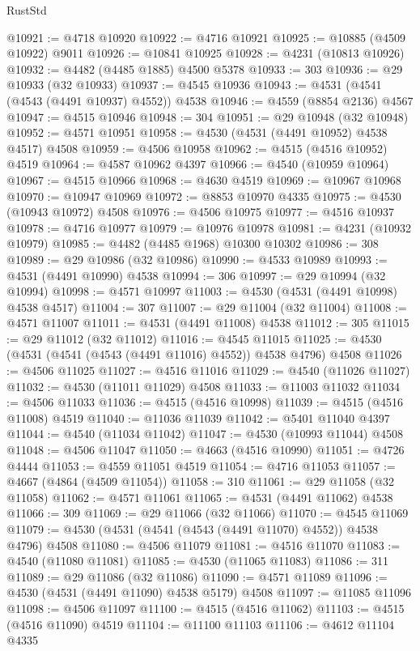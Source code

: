 \begin{lexlean}{RustStd}
\begin{coremodule}
{\begin{coremodule}
{{{{{{{{{{{{{{{{{{{{{{{{{{{{{{{{{{{{{{{{{{{{{{{{{{{{{{{@10921 := @4718 @10920
@10922 := @4716 @10921
@10925 := @10885 (@4509 @10922) @9011
@10926 := @10841 @10925
@10928 := @4231 (@10813 @10926)
@10932 := @4482 (@4485 @1885) @4500 @5378
@10933 := 303
@10936 := @29 @10933 (@32 @10933)
@10937 := @4545 @10936
@10943 := @4531 (@4541 (@4543 (@4491 @10937) @4552)) @4538
@10946 := @4559 (@8854 @2136) @4567
@10947 := @4515 @10946
@10948 := 304
@10951 := @29 @10948 (@32 @10948)
@10952 := @4571 @10951
@10958 := @4530 (@4531 (@4491 @10952) @4538 @4517) @4508
@10959 := @4506 @10958
@10962 := @4515 (@4516 @10952) @4519
@10964 := @4587 @10962 @4397
@10966 := @4540 (@10959 @10964)
@10967 := @4515 @10966
@10968 := @4630 @4519
@10969 := @10967 @10968
@10970 := @10947 @10969
@10972 := @8853 @10970 @4335
@10975 := @4530 (@10943 @10972) @4508
@10976 := @4506 @10975
@10977 := @4516 @10937
@10978 := @4716 @10977
@10979 := @10976 @10978
@10981 := @4231 (@10932 @10979)
@10985 := @4482 (@4485 @1968) @10300 @10302
@10986 := 308
@10989 := @29 @10986 (@32 @10986)
@10990 := @4533 @10989
@10993 := @4531 (@4491 @10990) @4538
@10994 := 306
@10997 := @29 @10994 (@32 @10994)
@10998 := @4571 @10997
@11003 := @4530 (@4531 (@4491 @10998) @4538 @4517)
@11004 := 307
@11007 := @29 @11004 (@32 @11004)
@11008 := @4571 @11007
@11011 := @4531 (@4491 @11008) @4538
@11012 := 305
@11015 := @29 @11012 (@32 @11012)
@11016 := @4545 @11015
@11025 := @4530 (@4531 (@4541 (@4543 (@4491 @11016) @4552)) @4538 @4796) @4508
@11026 := @4506 @11025
@11027 := @4516 @11016
@11029 := @4540 (@11026 @11027)
@11032 := @4530 (@11011 @11029) @4508
@11033 := @11003 @11032
@11034 := @4506 @11033
@11036 := @4515 (@4516 @10998)
@11039 := @4515 (@4516 @11008) @4519
@11040 := @11036 @11039
@11042 := @5401 @11040 @4397
@11044 := @4540 (@11034 @11042)
@11047 := @4530 (@10993 @11044) @4508
@11048 := @4506 @11047
@11050 := @4663 (@4516 @10990)
@11051 := @4726 @4444
@11053 := @4559 @11051 @4519
@11054 := @4716 @11053
@11057 := @4667 (@4864 (@4509 @11054))
@11058 := 310
@11061 := @29 @11058 (@32 @11058)
@11062 := @4571 @11061
@11065 := @4531 (@4491 @11062) @4538
@11066 := 309
@11069 := @29 @11066 (@32 @11066)
@11070 := @4545 @11069
@11079 := @4530 (@4531 (@4541 (@4543 (@4491 @11070) @4552)) @4538 @4796) @4508
@11080 := @4506 @11079
@11081 := @4516 @11070
@11083 := @4540 (@11080 @11081)
@11085 := @4530 (@11065 @11083)
@11086 := 311
@11089 := @29 @11086 (@32 @11086)
@11090 := @4571 @11089
@11096 := @4530 (@4531 (@4491 @11090) @4538 @5179) @4508
@11097 := @11085 @11096
@11098 := @4506 @11097
@11100 := @4515 (@4516 @11062)
@11103 := @4515 (@4516 @11090) @4519
@11104 := @11100 @11103
@11106 := @4612 @11104 @4335
}}}}}}}}}}}}}}}}}}}}}}}}}}}}}}}}}}}}}}}}}}}}}}}}}}}}}}}
\end{coremodule}}
\end{coremodule}
\end{lexlean}
